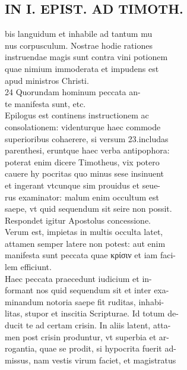 \documentclass{article}
\begin{document}
\begin{pages}
\section*{IN I. EPIST. AD TIMOTH. \\
                }
bis languidum et inhabile ad tantum mu \\
                nus corpusculum. Nostrae hodie rationes \\
                instruendae magis sunt contra vini potionem \\
                quae nimium immoderata et impudens est \\
                apud ministros Christi. \\
                24 Quorundam hominum peccata an- \\
                te manifesta sunt, etc. \\
                Epilogus est continens instructionem ac \\
                consolationem: videnturque haec commode \\
                superioribus cohaerere, si versum 23.includas \\
                parenthesi, eruntque haec verba antipophora: \\
                poterat enim dicere Timotheus, vix potero \\
                cauere hy pocritas quo minus sese insinuent \\
                et ingerant vtcunque sim prouidus et seue- \\
                rus examinator: malum enim occultum est \\
                saepe, vt quid sequendum sit seire non possit. \\
                Respondet igitur Apostolus concessione. \\
                Verum est, impietas in multis occulta latet, \\
                attamen semper latere non potest: aut enim \\
                manifesta sunt peccata quae κρίσιν et iam faci- \\
                lem efficiunt. \\
                Haec peccata praecedunt iudicium et in- \\
                formant nos quid sequendum sit et inter exa- \\
                minandum notoria saepe fit ruditas, inhabi- \\
                litas, stupor et inscitia Scripturae. Id totum de- \\
                ducit te ad certam crisin. In aliis latent, atta- \\
                men post crisin produntur, vt superbia et ar- \\
                rogantia, quae se prodit, si hypocrita fuerit ad- \\
                missus, nam vestis virum faciet, et magistratus \\
                

\end{pages}
\end{document}
